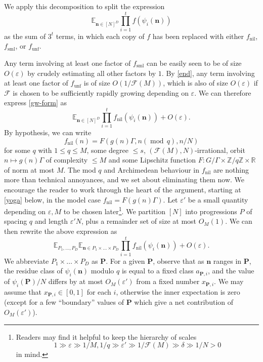 \documentclass[11pt,reqno]{amsart}
\numberwithin{equation}{section}
\theoremstyle{plain}
\theoremstyle{definition}
\renewcommand{\leq}{\leqslant}
\newcommand{\md}[1]{\ensuremath{(\operatorname{mod}\, #1)}}
\newcommand\E{{\mathbb{E}}}
\newcommand\Z{\mathbb{Z}}
\newcommand\R{\mathbb{R}}
\newcommand\1{{\bf 1}}
\newcommand\2{{\bf 2}}
\newcommand\eps{\varepsilon}
\newcommand\nil{{\operatorname{nil}}}
\newcommand\sml{{\operatorname{sml}}}
\newcommand\unf{{\operatorname{unf}}}
\newcommand\Grow{{\mathcal F}}
\begin{document}
We apply this decomposition to split the expression
\begin{equation}\label{gw-form}
 \E_{\mathbf{n} \in [N]^D} \prod_{i=1}^t f( \psi_i(\mathbf{n}) ) 
\end{equation}
as the sum of $3^t$ terms, in which each copy of $f$ has been replaced with either $f_\nil$, $f_\sml$, or $f_\unf$.

Any term involving at least one factor of $f_\sml$ can be easily seen to be of size $O(\eps)$ by crudely estimating all other factors by $1$.  By \eqref{end}, any term involving at least one factor of $f_\unf$ is of size $O(1/\Grow(M))$, which is also of size $O(\eps)$ if $\Grow$ is chosen to be sufficiently rapidly growing depending on $\eps$.  We can therefore express \eqref{gw-form} as
$$
 \E_{\mathbf{n}\in [N]^D} \prod_{i=1}^t f_\nil(\psi_i(\mathbf{n}) ) + O(\eps).
$$
By hypothesis, we can write
$$ f_\nil(n) = F( g(n) \Gamma, n \md{q}, n/N )$$
for some $q$ with $1 \leq q \leq M$, some degree $\leq s$, $(\Grow(M),N)$-irrational, orbit $n \mapsto g(n) \Gamma$ of complexity $\leq M$ and some Lipschitz function $F: G/\Gamma \times \Z/q\Z \times \R$ of norm at most $M$. The mod $q$ and Archimedean behaviour in $f_\nil$ are nothing more than technical annoyances, and we set about eliminating them now. We encourage the reader to work through the heart of the argument, starting at \eqref{yoga} below, in the model case $f_{\nil} = F(g(n)\Gamma)$.  Let $\eps'$ be a small quantity depending on $\eps, M$ to be chosen later\footnote{Readers may find it helpful to keep the hierarchy of scales 
$$ 1 \gg \eps \gg 1/M, 1/q \gg \eps' \gg 1/\Grow(M) \gg \delta \gg 1/N > 0$$
in mind.}.  We partition $[N]$ into progressions $P$ of spacing $q$ and length $\eps' N$, plus a remainder set of size at most $O_M(1)$.  We can then rewrite the above expression as
$$
 \E_{P_1,\ldots,P_D} \E_{\mathbf{n} \in P_1 \times \dots \times P_D}  \prod_{i=1}^t f_\nil( \psi_i(\mathbf{n}) ) + O(\eps).
$$
We abbreviate $P_1 \times \ldots \times P_D$ as ${\mathbf{P}}$.
For a given ${\mathbf{P}}$, observe that as $\mathbf{n}$ ranges in ${\mathbf{P}}$, the residue class of $\psi_i(\mathbf{n})$ modulo $q$ is equal to a fixed class $a_{{\mathbf{P}},i}$, and the value of $\psi_i({\mathbf{P}})/N$ differs by at most $O_M(\eps')$ from a fixed number $x_{{\mathbf{P}},i}$.  We may assume that $x_{{\mathbf{P}},i} \in [0,1]$ for each $i$, otherwise the inner expectation is zero (except for a few ``boundary'' values of ${\mathbf{P}}$ which give a net contribution of $O_M(\eps')$).
\end{document}

